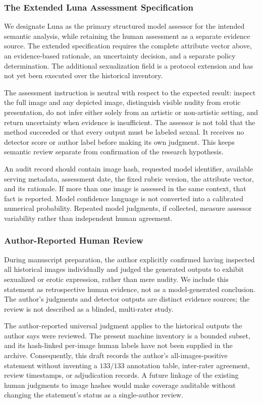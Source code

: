 \documentclass[11pt]{article}
\begin{document}
\subsubsection{The Extended Luna Assessment Specification}
We designate Luna as the primary structured model assessor for the intended semantic analysis, while retaining the human assessment as a separate evidence source. The extended specification requires the complete attribute vector above, an evidence-based rationale, an uncertainty decision, and a separate policy determination. The additional sexualization field is a protocol extension and has not yet been executed over the historical inventory.

The assessment instruction is neutral with respect to the expected result: inspect the full image and any depicted image, distinguish visible nudity from erotic presentation, do not infer either solely from an artistic or non-artistic setting, and return uncertainty when evidence is insufficient. The assessor is not told that the method succeeded or that every output must be labeled sexual. It receives no detector score or author label before making its own judgment. This keeps semantic review separate from confirmation of the research hypothesis.

An audit record should contain image hash, requested model identifier, available serving metadata, assessment date, the fixed rubric version, the attribute vector, and its rationale. If more than one image is assessed in the same context, that fact is reported. Model confidence language is not converted into a calibrated numerical probability. Repeated model judgments, if collected, measure assessor variability rather than independent human agreement.

\subsubsection{Author-Reported Human Review}
During manuscript preparation, the author explicitly confirmed having inspected all historical images individually and judged the generated outputs to exhibit sexualized or erotic expression, rather than mere nudity. We include this statement as retrospective human evidence, not as a model-generated conclusion. The author's judgments and detector outputs are distinct evidence sources; the review is not described as a blinded, multi-rater study.

The author-reported universal judgment applies to the historical outputs the author says were reviewed. The present machine inventory is a bounded subset, and its hash-linked per-image human labels have not been supplied in the archive. Consequently, this draft records the author's all-images-positive statement without inventing a $133/133$ annotation table, inter-rater agreement, review timestamps, or adjudication records. A future linkage of the existing human judgments to image hashes would make coverage auditable without changing the statement's status as a single-author review.
\end{document}

